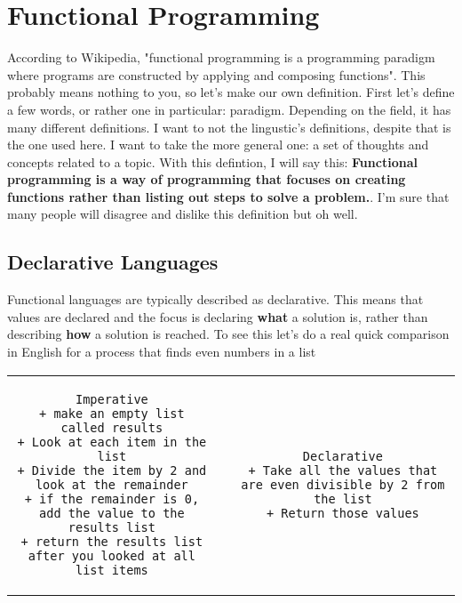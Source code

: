 \documentclass[main.tex]{subfiles}
\begin{document}
\section{Functional Programming}

According to Wikipedia, "functional programming is a programming paradigm where programs are constructed by applying and composing functions". This probably means nothing to you, so let's make our own definition. First let's define a few words, or rather one in particular: paradigm. Depending on the field, it has many different definitions. I want to not the lingustic's definitions, despite that is the one used here. I want to take the more general one: a set of thoughts and concepts related to a topic. With this defintion, I will say this: \textbf{Functional programming is a way of programming that focuses on creating functions rather than listing out steps to solve a problem.}. I'm sure that many people will disagree and dislike this definition but oh well. 

\subsection{Declarative Languages}
Functional languages are typically described as declarative. This means that values are declared and the focus is declaring \textbf{what} a solution is, rather than describing \textbf{how} a solution is reached. 
To see this let's do a real quick comparison in English for a process that finds even numbers in a list
\begin{table}[H]
    \centering
    \begin{tabular}{ccc}
        \begin{lstlisting}[]
    Imperative
+ make an empty list called results
+ Look at each item in the list
+ Divide the item by 2 and look at the remainder
+ if the remainder is 0, add the value to the results list
+ return the results list after you looked at all list items
       \end{lstlisting} & \hspace{1cm} & 
        \begin{lstlisting}[]
    Declarative
+ Take all the values that are even divisible by 2 from the list
+ Return those values
        \end{lstlisting} \\
    \end{tabular}
\end{table}
\end{document}
